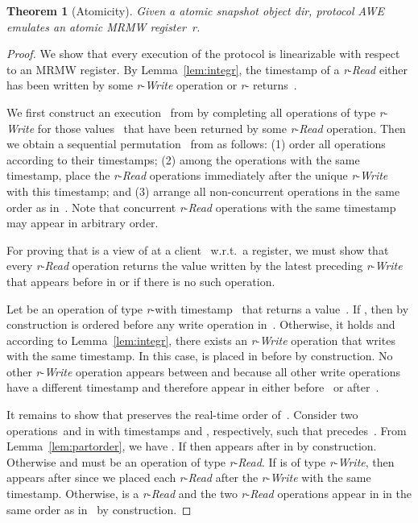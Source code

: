 \documentclass[oribibl]{llncs}
\newtheorem{theorem}{Theorem}
\theoremstyle{definition-boldhead}
\newcommand{\var}[1]{\textit{#1}}
\newcommand{\op}[1]{\textsl{#1}}
\newcommand{\dir}{\var{dir}\xspace}
\newcommand{\NAME}{AWE\xspace}
\begin{document}
\if\submit\no
\begin{theorem}[Atomicity]\label{thm:atomic}
  Given a atomic snapshot object \dir, protocol \NAME emulates an
  atomic MRMW register~\var{r}.
\end{theorem}


\begin{proof}
  We show that every execution  of the protocol is
  linearizable with respect to an MRMW register.  By
  Lemma~\ref{lem:integr}, the timestamp of a \var{r}-\op{Read} either
  has been written by some \var{r}-\op{Write} operation or \var{r}-\opread
  returns~.

  We first construct an execution~ from  by completing
  all operations of type \var{r}-\op{Write} for those values~ that
  have been returned by some \var{r}-\op{Read} operation. Then we
  obtain a sequential permutation~ from  as follows: (1)
  order all operations according to their timestamps; (2) among the
  operations with the same timestamp, place the \var{r}-\op{Read}
  operations immediately after the unique \var{r}-\op{Write} with this
  timestamp; and (3) arrange all non-concurrent operations in the same
  order as in~.  Note that concurrent \var{r}-\op{Read}
  operations with the same timestamp may appear in arbitrary order.

  For proving that  is a view of  at a client~ w.r.t.\ a
  register, we must show that every \var{r}-\op{Read} operation
  returns the value written by the latest preceding \var{r}-\op{Write}
  that appears before in  or  if there is no such
  operation.

  Let  be an operation of type \var{r}-\opread with
  timestamp~ that returns a value~. If , then
  by construction  is ordered before any write operation
  in~.  Otherwise, it holds  and according to
  Lemma~\ref{lem:integr}, there exists an \var{r}-\op{Write} operation
   that writes  with the same timestamp.  In this case, 
  is placed in  before  by construction.  No other
  \var{r}-\op{Write} operation appears between  and  because
  all other write operations have a different timestamp and therefore
  appear in  either before~ or after~.

  It remains to show that  preserves the real-time order
  of~.  Consider two operations~\opr and \popr in  with
  timestamps  and , respectively, such
  that \opr precedes~\popr.  From Lemma~\ref{lem:partorder}, we have
  . If  then \popr appears
  after \opr in  by construction.  Otherwise 
  and \popr must be an operation of type \var{r}-\op{Read}.  If \opr
  is of type \var{r}-\op{Write}, then \popr appears after \opr since
  we placed each \var{r}-\op{Read} after the \var{r}-\op{Write} with
  the same timestamp.  Otherwise, \opr is a \var{r}-\op{Read} and the
  two \var{r}-\op{Read} operations appear in  in the same order
  as in~ by construction.
\end{proof}
\fi
\end{document}
